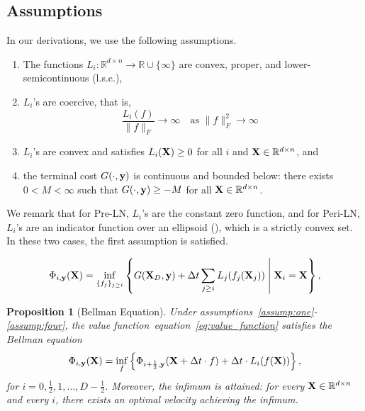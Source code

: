 \documentclass[10pt,a4paper]{amsart}
\newtheorem{proposition}{Proposition}
\newcommand{\bfX}{{\bf X}}
\newcommand{\bfy}{ {\bf y}}
\def\eqref#1{equation~\ref{#1}}
\begin{document}
\subsection{Assumptions}
In our derivations, we use the following assumptions.
\begin{enumerate}[label=(A\arabic*)]
    \item \label{assump:one}The functions $L_i: \mathbb{R}^{d\times n} \to \mathbb{R} \cup \{\infty\}$ are convex, proper, and lower-semicontinuous (l.s.c.),
    \item \label{assump:two}$L_i$'s are coercive, that is,
    \[
    \frac{L_i(f)}{\| f\|_F} \to \infty \quad \text{as $\| f\|_F^2 \to \infty$ }
    \]
    \item \label{assump:three}$L_i$'s are convex and satisfies $L_i(\bfX) \geq 0$ for all $i$ and $\bfX \in \mathbb{R}^{d \times n}$, and 
    \item \label{assump:four}the terminal cost $G(\cdot, \bfy)$ is continuous and bounded below: there exists $0< M < \infty$ such that $G(\cdot, \bfy) \geq -M$ for all $\bfX \in \mathbb{R}^{d \times n}$.
\end{enumerate}
We remark that for Pre-LN, $L_i$'s are the constant zero function, and for Peri-LN, $L_i$'s are an indicator function over an ellipsoid (), which is a strictly convex set. In these two cases, the first assumption is satisfied. 

\begin{equation}\label{eq:value_function}
    \Phi_{i, \bfy}(\bfX) = \inf_{\{ f_j\}_{j \geq i} } \left\{ G(\bfX_D, \bfy) + \Delta t \sum_{j \geq i} L_j(f_j(\bfX_j)) \; \middle| \; \bfX_i=\bfX \right\},
\end{equation}

\begin{proposition}[Bellman Equation]\label{prop:Bellman}
    Under assumptions~\ref{assump:one}-\ref{assump:four}, the value function~\eqref{eq:value_function} satisfies the Bellman equation
    \begin{equation}\label{eq:value_function_recursive}
        \Phi_{i, \bfy}(\bfX) = \inf_{f} \left\{ \Phi_{i+\frac{1}{2}, \bfy}(\bfX + \Delta t \cdot f) + \Delta t \cdot L_i(f(\bfX)) \right\},
    \end{equation}
    for $i=0,\frac{1}{2},1,...,D-\frac{1}{2}$. Moreover, the infimum is attained: for every $\bfX \in \mathbb{R}^{d \times n}$ and every $i$, there exists an optimal velocity achieving the infimum.
\end{proposition}
\end{document}
